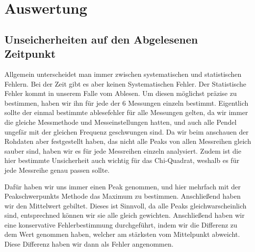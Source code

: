 \documentclass[twoside]{protokoll}
\begin{document}
\section{Auswertung}
\subsection{Unseicherheiten auf den Abgelesenen Zeitpunkt}
Allgemein unterscheidet man immer zwischen systematischen und statistischen Fehlern.
Bei der Zeit gibt es aber keinen Systematischen Fehler.
Der Statistische Fehler kommt in unserem Falle vom Ablesen.
Um diesen möglichst präzise zu bestimmen, haben wir ihn für jede der 6 Messungen einzeln bestimmt.
Eigentlich sollte der einmal bestimmte ablesefehler für alle Messungen gelten, da wir immer die gleiche Messmethode und Messeinstellungen hatten, und auch alle Pendel ungefär mit der gleichen Frequenz geschwungen sind.
Da wir beim anschauen der Rohdaten aber festgestellt haben, das nicht alle Peaks von allen Messreihen gleich sauber sind, haben wir es für jede Messreihen einzeln analysiert.
Zudem ist die hier bestimmte Unsicherheit auch wichtig für das Chi-Quadrat, weshalb es für jede Messreihe genau passen sollte.
 
Dafür haben wir uns immer einen Peak genommen, und hier mehrfach mit der Peakschwerpunkts Methode das Maximum zu bestimmen.
Anschließend haben wir den Mittelwert gebiltet.
Dieses ist Sinnvoll, da alle Peaks gleichwarscheinlich sind, entsprechned können wir sie alle gleich gewichten.
Anschließend haben wir eine konservative Fehlerbestimmung durchgeführt, indem wir die Differenz zu dem Wert genommen haben, welcher am stärksten vom Mittelpunkt abweicht.
Diese Differenz haben wir dann als Fehler angenommen.
 
\end{document}
